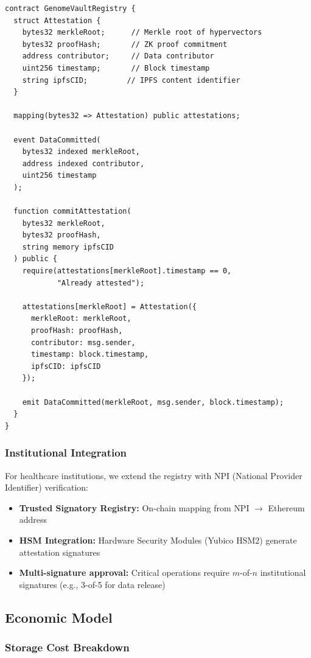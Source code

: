 \documentclass[12pt,a4paper]{article}
\begin{document}
\begin{verbatim}
contract GenomeVaultRegistry {
  struct Attestation {
    bytes32 merkleRoot;      // Merkle root of hypervectors
    bytes32 proofHash;       // ZK proof commitment
    address contributor;     // Data contributor
    uint256 timestamp;       // Block timestamp
    string ipfsCID;         // IPFS content identifier
  }

  mapping(bytes32 => Attestation) public attestations;

  event DataCommitted(
    bytes32 indexed merkleRoot,
    address indexed contributor,
    uint256 timestamp
  );

  function commitAttestation(
    bytes32 merkleRoot,
    bytes32 proofHash,
    string memory ipfsCID
  ) public {
    require(attestations[merkleRoot].timestamp == 0,
            "Already attested");

    attestations[merkleRoot] = Attestation({
      merkleRoot: merkleRoot,
      proofHash: proofHash,
      contributor: msg.sender,
      timestamp: block.timestamp,
      ipfsCID: ipfsCID
    });

    emit DataCommitted(merkleRoot, msg.sender, block.timestamp);
  }
}
\end{verbatim}

\subsubsection{Institutional Integration}

For healthcare institutions, we extend the registry with NPI (National Provider Identifier) verification:

\begin{itemize}
\item \textbf{Trusted Signatory Registry:} On-chain mapping from NPI $\to$ Ethereum address
\item \textbf{HSM Integration:} Hardware Security Modules (Yubico HSM2) generate attestation signatures
\item \textbf{Multi-signature approval:} Critical operations require $m$-of-$n$ institutional signatures (e.g., 3-of-5 for data release)
\end{itemize}

\subsection{Economic Model}

\subsubsection{Storage Cost Breakdown}
\end{document}
